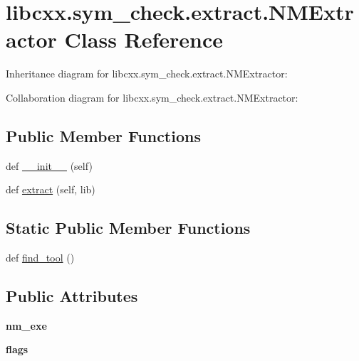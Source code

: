 \hypertarget{classlibcxx_1_1sym__check_1_1extract_1_1_n_m_extractor}{}\section{libcxx.\+sym\+\_\+check.\+extract.\+N\+M\+Extractor Class Reference}
\label{classlibcxx_1_1sym__check_1_1extract_1_1_n_m_extractor}


Inheritance diagram for libcxx.\+sym\+\_\+check.\+extract.\+N\+M\+Extractor\+:


Collaboration diagram for libcxx.\+sym\+\_\+check.\+extract.\+N\+M\+Extractor\+:
\subsection*{Public Member Functions}
\begin{DoxyCompactItemize}
\item 
def \mbox{\hyperlink{classlibcxx_1_1sym__check_1_1extract_1_1_n_m_extractor_a1bf604506d834cbee90cba626a00847c}{\+\_\+\+\_\+init\+\_\+\+\_\+}} (self)
\item 
def \mbox{\hyperlink{classlibcxx_1_1sym__check_1_1extract_1_1_n_m_extractor_a6c940e47384511a3e2d3312c3a5bc217}{extract}} (self, lib)
\end{DoxyCompactItemize}
\subsection*{Static Public Member Functions}
\begin{DoxyCompactItemize}
\item 
def \mbox{\hyperlink{classlibcxx_1_1sym__check_1_1extract_1_1_n_m_extractor_aec56c895c4fac5589f108c9a12ea4f3f}{find\+\_\+tool}} ()
\end{DoxyCompactItemize}
\subsection*{Public Attributes}
\begin{DoxyCompactItemize}
\item 
\mbox{\label{classlibcxx_1_1sym__check_1_1extract_1_1_n_m_extractor_a1f9946e5585865bfb04c62f50734805d}} 
{\bfseries nm\+\_\+exe}
\item 
\mbox{\label{classlibcxx_1_1sym__check_1_1extract_1_1_n_m_extractor_a5e251b5a2de20ccd34d0b06840366c86}} 
{\bfseries flags}
\end{DoxyCompactItemize}


